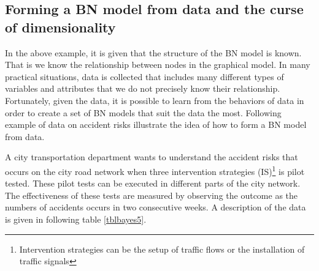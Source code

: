 \subsection{Forming a BN model from data and the curse of dimensionality}
In the above example, it is given that the structure of the BN model is known. That is we know the relationship between nodes in the graphical model. In many practical situations, data is collected that includes many different types of variables and attributes that we do not precisely know their relationship. Fortunately, given the data, it is possible to learn from the behaviors of data in order to create a set of BN models that suit the data the most. Following example of data on accident risks illustrate the idea of how to form a BN model from data.

A city transportation department wants to understand the accident risks that occurs on the city
road network when three intervention strategies (IS)\footnote{ Intervention strategies can be the setup of traffic flows or the installation of traffic signals
} is pilot tested. These pilot tests can be
executed in different parts of the city network. The effectiveness of these tests are measured
by observing the outcome as the numbers of accidents occurs in two consecutive weeks. A
description of the data is given in following table \ref{tblbayes5}.

